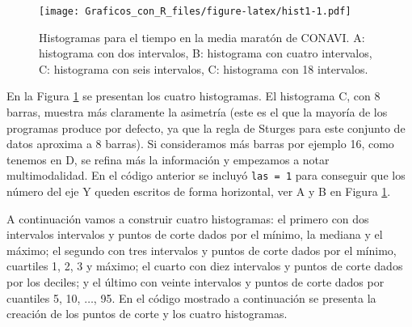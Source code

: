 \documentclass[10pt,]{krantz}
\begin{document}
\begin{figure}[htbp]
\centering
\texttt{[image: Graficos\_con\_R\_files/figure-latex/hist1-1.pdf]}
\caption{\label{fig:hist1}Histogramas para el tiempo en la media maratón de
CONAVI. A: histograma con dos intervalos, B: histograma con cuatro
intervalos, C: histograma con seis intervalos, C: histograma con 18
intervalos.}
\end{figure}

En la Figura \ref{fig:hist1} se presentan los cuatro histogramas. El
histograma C, con 8 barras, muestra más claramente la asimetría (este es
el que la mayoría de los programas produce por defecto, ya que la regla
de Sturges para este conjunto de datos aproxima a 8 barras). Si
consideramos más barras por ejemplo 16, como tenemos en D, se refina más
la información y empezamos a notar multimodalidad. En el código anterior
se incluyó \texttt{las\ =\ 1} para conseguir que los número del eje Y
queden escritos de forma horizontal, ver A y B en Figura
\ref{fig:hist1}.

A continuación vamos a construir cuatro histogramas: el primero con dos
intervalos intervalos y puntos de corte dados por el mínimo, la mediana
y el máximo; el segundo con tres intervalos y puntos de corte dados por
el mínimo, cuartiles 1, 2, 3 y máximo; el cuarto con diez intervalos y
puntos de corte dados por los deciles; y el último con veinte intervalos
y puntos de corte dados por cuantiles 5, 10, \(\ldots\), 95. En el
código mostrado a continuación se presenta la creación de los puntos de
corte y los cuatro histogramas.
\end{document}
